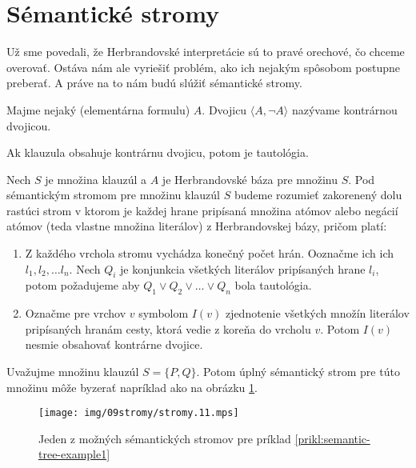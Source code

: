 \section{Sémantické stromy}

Už sme povedali, že Herbrandovské interpretácie sú to pravé orechové,
čo chceme overovať. Ostáva nám ale vyriešiť problém, ako ich nejakým
spôsobom postupne preberať. A práve na to nám budú slúžiť sémantické
stromy.

\begin{definicia}
    Majme nejaký (elementárna formulu) $A$. Dvojicu
    $\langle A, \neg A \rangle$ nazývame kontrárnou dvojicou.

    Ak klauzula obsahuje kontrárnu dvojicu, potom je tautológia.
\end{definicia}

\begin{definicia}
    Nech $S$ je množina klauzúl a $A$ je Herbrandovské báza pre
    množinu $S$. Pod sémantickým stromom pre množinu klauzúl $S$
    budeme rozumieť zakorenený dolu rastúci strom
    v ktorom je každej hrane pripísaná množina atómov alebo negácií
    atómov (teda vlastne množina literálov) z Herbrandovskej bázy,
    pričom platí:
    \begin{enumerate}
        \item Z každého vrchola stromu vychádza konečný počet hrán.
            Ooznačme ich ich $l_1, l_2, \ldots l_n$.
            Nech $Q_i$ je konjunkcia všetkých literálov
            pripísaných hrane $l_i$, potom požadujeme aby 
            $Q_1 \lor Q_2 \lor \ldots \lor Q_n$ bola tautológia.

        \item Označme pre vrchov $v$ symbolom $I(v)$
            zjednotenie všetkých množín literálov pripísaných hranám cesty,
            ktorá vedie z koreňa do vrcholu $v$. Potom $I(v)$
            nesmie obsahovať kontrárne dvojice.
    \end{enumerate}
\end{definicia}

\begin{priklad}
    \label{prikl:semantic-tree-example1}
    Uvažujme množinu klauzúl $S = \{P,Q\}$. Potom úplný sémantický strom
    pre túto množinu môže byzerať napríklad ako na obrázku
    \ref{fig:semantic-tree-example1}.

    \begin{figure}[h]
        \centering
        \texttt{[image: img/09stromy/stromy.11.mps]}
        \caption{Jeden z možných sémantických stromov pre príklad
                \ref{prikl:semantic-tree-example1}}
        \label{fig:semantic-tree-example1}
    \end{figure}
\end{priklad}

